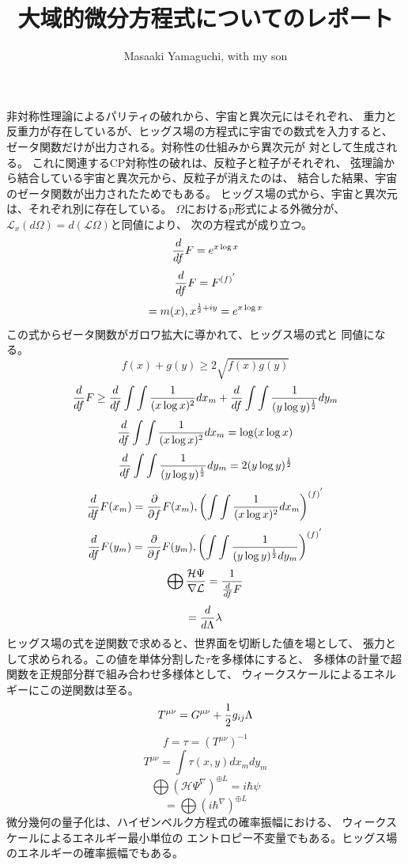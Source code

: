 \documentclass{jsarticle}
\begin{document}
\title{大域的微分方程式についてのレポート}
\author{Masaaki Yamaguchi, with my son}
\date{}
\maketitle

  非対称性理論によるパリティの破れから、宇宙と異次元にはそれぞれ、
  重力と反重力が存在しているが、ヒッグス場の方程式に宇宙での数式を入力すると、
  ゼータ関数だけが出力される。対称性の仕組みから異次元が
  対として生成される。
  これに関連するCP対称性の破れは、反粒子と粒子がそれぞれ、
  弦理論から結合している宇宙と異次元から、反粒子が消えたのは、
  結合した結果、宇宙のゼータ関数が出力されたためでもある。
  ヒッグス場の式から、宇宙と異次元は、それぞれ別に存在している。
  $ \Omega $におけるp形式による外微分が、
  $ \mathcal{L}_x (d \Omega) = d(\mathcal{L} \Omega) $と同値により、
  次の方程式が成り立つ。
  $$ {d \over df}F = e^{x \log x} $$
  $$ {d \over df}F = F^{{(f)}^{'}} $$
  $$ = m(x), x^{{1 \over 2} + iy} = e^{x \log x} $$
  この式からゼータ関数がガロワ拡大に導かれて、ヒッグス場の式と
  同値になる。
  $$ f(x) + g(y) \ge 2 \sqrt{f(x) g(y)} $$ 
  $$ {d \over df}F \ge {d \over df}\int \int{1 \over (x \log x)^2}dx_m 
  + {d \over df}\int \int{1 \over (y \log y)^{1 \over 2}}dy_m $$
  $$ {d \over df}  \int \int{1 \over (x \log x)^2}dx_m = \log (x \log x) $$
  $$ {d \over df}\int \int{1 \over (y \log y)^{1 \over 2}}dy_m = 
  2(y \log y)^{1 \over 2} $$
  $$  {d \over df} F(x_m) = {\partial \over \partial f}F(x_m),
  \left({\int \int{1 \over (x \log x)^2}dx_m}\right)^{(f)^{'}} $$ 
  $$ {d \over df} F(y_m) = {\partial \over \partial f}F(y_m),
  \left({\int \int{1 \over (y \log y)^{1 \over 2}dy_m}}\right)^{(f)^{'}} $$
  $$ \bigoplus {\mathcal{H}\Psi \over \nabla \mathcal{L}} 
     = {1 \over {{d \over d f}F}}  $$
  $$ = {d \over d \Lambda}\lambda $$
  ヒッグス場の式を逆関数で求めると、世界面を切断した値を場として、
  張力として求められる。この値を単体分割した$ \tau $を多様体にすると、
  多様体の計量で超関数を正規部分群で組み合わせ多様体として、
  ウィークスケールによるエネルギーにこの逆関数は至る。
  $$ T^{\mu\nu} =  {G^{\mu\nu} + {1 \over 2}g_{ij}\Lambda} $$
  $$ f = \tau = \left(T^{\mu\nu}\right)^{-1} $$
  $$ T^{\mu\nu} = \int \tau(x,y) dx_m dy_m $$
  $$ \bigoplus \left({\mathcal{H}\Psi}^{\nabla} \right)^{\oplus L} = 
  i \hbar \psi $$
  $$ = \bigoplus {{\left({i \hbar}^{\nabla} \right)}^{\oplus L}} $$
  微分幾何の量子化は、ハイゼンベルク方程式の確率振幅における、
  ウィークスケールによるエネルギー最小単位の
  エントロピー不変量でもある。ヒッグス場のエネルギーの確率振幅でもある。
\end{document}
